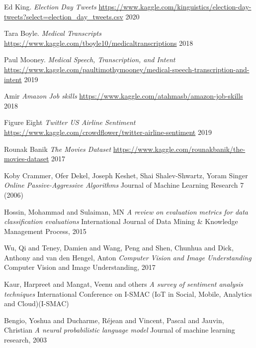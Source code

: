 \begin{thebibliography}{9}
Ed King.
\textit{Election Day Tweets}
\url{https://www.kaggle.com/kinguistics/election-day-tweets?select=election_day_tweets.csv}
2020

Tara Boyle.
\textit{Medical Transcripts}
\url{https://www.kaggle.com/tboyle10/medicaltranscriptions}
2018

Paul Mooney.
\textit{Medical Speech, Transcription, and Intent}
\url{https://www.kaggle.com/paultimothymooney/medical-speech-transcription-and-intent}
2019

Amir
\textit{Amazon Job skills}
\url{https://www.kaggle.com/atahmasb/amazon-job-skills}
2018

Figure Eight
\textit{Twitter US Airline Sentiment}
\url{https://www.kaggle.com/crowdflower/twitter-airline-sentiment}
2019

Rounak Banik
\textit{The Movies Dataset}
\url{https://www.kaggle.com/rounakbanik/the-movies-dataset}
2017

Koby Crammer, Ofer Dekel, Joseph Keshet, Shai Shalev-Shwartz, Yoram Singer\newline
\textit{Online Passive-Aggressive Algorithms}\newline
Journal of Machine Learning Research 7 (2006) 

Hossin, Mohammad and Sulaiman, MN\newline
\textit{A review on evaluation metrics for data classification evaluations}\newline
International Journal of Data Mining \& Knowledge Management Process, 2015

Wu, Qi and Teney, Damien and Wang, Peng and Shen, Chunhua and Dick, Anthony and van den Hengel, Anton\newline
\textit{Computer Vision and Image Understanding}
Computer Vision and Image Understanding, 2017

Kaur, Harpreet and Mangat, Veenu and others\newline
\textit{A survey of sentiment analysis techniques} International Conference on I-SMAC (IoT in Social, Mobile, Analytics and Cloud)(I-SMAC)

Bengio, Yoshua and Ducharme, R{\'e}jean and Vincent, Pascal and Jauvin, Christian\newline
\textit{A neural probabilistic language model}\newline
Journal of machine learning research, 2003


\end{thebibliography}
